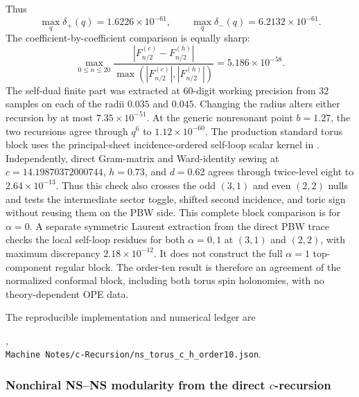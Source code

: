 \documentclass[11pt]{article}
\begin{document}
Thus
\begin{equation}
 \max_q\delta_{+}(q)=1.6226\times10^{-61},
 \qquad
 \max_q\delta_{-}(q)=6.2132\times10^{-61}.
 \label{eq:torus-c-h-order-ten-result}
\end{equation}
The coefficient-by-coefficient comparison is equally sharp:
\begin{equation}
 \max_{0\leq n\leq20}
 \frac{|F_{n/2}^{(c)}-F_{n/2}^{(h)}|}
      {\max(|F_{n/2}^{(c)}|,|F_{n/2}^{(h)}|)}
 =5.186\times10^{-58}.
 \label{eq:torus-c-h-coefficient-result}
\end{equation}
The self-dual finite part was extracted at \(60\)-digit working precision
from \(32\) samples on each of the radii \(0.035\) and \(0.045\).  Changing
the radius alters either recursion by at most \(7.35\times10^{-51}\).
At the generic nonresonant point \(b=1.27\), the two recursions agree through
\(q^6\) to \(1.12\times10^{-60}\).  The production standard torus block uses
the principal-sheet incidence-ordered self-loop scalar kernel in
.  Independently, direct Gram-matrix and
Ward-identity sewing at \(c=14.19870372000744\), \(h=0.73\), and \(d=0.62\)
agrees through twice-level eight to \(2.64\times10^{-13}\).  Thus this check
also crosses the odd \((3,1)\) and even \((2,2)\) nulls and tests the
intermediate sector toggle, shifted second incidence, and toric sign without
reusing them on the PBW side.  This complete block comparison is for
\(\alpha=0\).  A separate symmetric Laurent extraction from the direct PBW
trace checks the local self-loop residues for both \(\alpha=0,1\) at
\((3,1)\) and \((2,2)\), with maximum discrepancy
\(2.18\times10^{-12}\).  It does not construct the full \(\alpha=1\)
top-component regular block.  The order-ten result is therefore
an agreement of the normalized conformal block, including both torus spin
holonomies, with no theory-dependent OPE data.

The reproducible implementation and numerical ledger are
\begin{center}
 ,\\
 \texttt{Machine Notes/c-Recursion/ns\_torus\_c\_h\_order10.json}.
\end{center}

\subsubsection{Nonchiral NS--NS modularity from the direct \texorpdfstring{\(c\)}{c}-recursion}
\label{sec:torus-one-point-direct-c-modularity}
\end{document}
